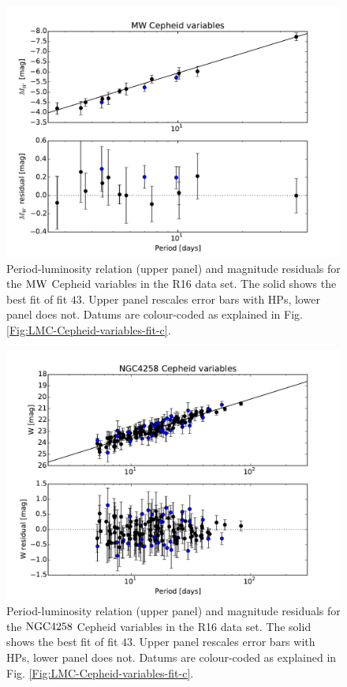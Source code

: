\begin{figure}[hbtp]
\centering
\includegraphics[scale=0.75]{figures/chapter-h0/effective_HP_cepheids_MW_r16.pdf}
\caption{Period-luminosity relation (upper panel) and magnitude residuals for the $\mathrm{MW}$ Cepheid variables in the R16 data set. The solid  shows the best fit of fit $43$. Upper panel rescales error bars with HPs, lower panel does not. Datums are colour-coded as explained in Fig. \ref{Fig:LMC-Cepheid-variables-fit-c}.}
\label{Fig:R16-MW}
\end{figure}

\begin{figure}[hbtp]
\centering
\includegraphics[scale=0.75]{figures/chapter-h0/effective_HP_cepheids_NGC4258_R16.pdf}
\caption{Period-luminosity relation (upper panel) and magnitude residuals for the $\mathrm{NGC4258}$ Cepheid variables in the R16 data set. The solid  shows the best fit of fit $43$. Upper panel rescales error bars with HPs, lower panel does not. Datums are colour-coded as explained in Fig. \ref{Fig:LMC-Cepheid-variables-fit-c}.}
\label{Fig:R16-4258}
\end{figure}

